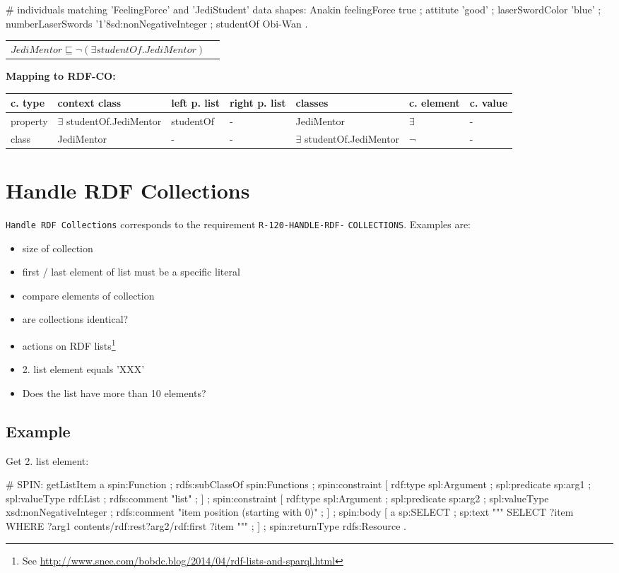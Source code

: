 \documentclass{llncs}
\newcommand{\ms}[1]{\texttt{#1}}
\newenvironment{gcotable}{
  \scriptsize
  \sffamily
  \vspace{0cm}
	\begin{center}
	\textbf{\vspace{0.4cm}Mapping to RDF-CO:} \\
  \begin{tabular}{l|l|l|l|l|l|l}
	\hline
  \textbf{c. type} & \textbf{context class} & \textbf{left p. list} & \textbf{right p. list} & \textbf{classes} & \textbf{c. element} & \textbf{c. value} \\
  \hline

}{
  \hline
  \end{tabular}
	\end{center}
}
\newenvironment{DL}{
  \vspace{0cm}
	\begin{center}
  \begin{tabular}{r l}

}{
  \end{tabular}
	\end{center}
}
\begin{document}
\begin{ex}
# individuals matching 'FeelingForce' and 'JediStudent' data shapes:
Anakin 
    feelingForce true ;
    attitute 'good' ;
    laserSwordColor 'blue' ;
    numberLaserSwords '1'^^xsd:nonNegativeInteger ;
    studentOf Obi-Wan .
\end{ex}

\begin{DL}
$JediMentor \sqsubseteq \neg(\exists studentOf.JediMentor)$
\end{DL}

\begin{gcotable}
property & $\exists$ studentOf.JediMentor & studentOf & - & JediMentor & $\exists$ & - \\
class & JediMentor & - & - & $\exists$ studentOf.JediMentor & $\neg$ & - \\
\end{gcotable}

\section{Handle RDF Collections}

\ms{Handle RDF Collections} corresponds to the requirement
\ms{R-120-HANDLE-RDF-} \ms{COLLECTIONS}.
Examples are:
\begin{itemize}
	\item size of collection
	\item first / last element of list must be a specific literal
	\item compare elements of collection
	\item are collections identical?
	\item actions on RDF lists\footnote{See \url{http://www.snee.com/bobdc.blog/2014/04/rdf-lists-and-sparql.html}}
	\item 2. list element equals 'XXX'
	\item Does the list have more than 10 elements?
\end{itemize}

\subsection{Example}

Get 2. list element:

\begin{ex}
# SPIN:
getListItem
    a spin:Function ; rdfs:subClassOf spin:Functions ;
    spin:constraint [
        rdf:type spl:Argument ;
        spl:predicate sp:arg1 ;
        spl:valueType rdf:List ;
        rdfs:comment "list" ; ] ;
    spin:constraint [
        rdf:type spl:Argument ;
        spl:predicate sp:arg2 ;
        spl:valueType xsd:nonNegativeInteger ;
        rdfs:comment "item position (starting with 0)" ; ] ;
    spin:body [
        a sp:SELECT ;
        sp:text """
            SELECT ?item
            WHERE {
                ?arg1 contents/rdf:rest{?arg2}/rdf:first ?item } """ ; ] ;
    spin:returnType rdfs:Resource .
\end{ex}
\end{document}
